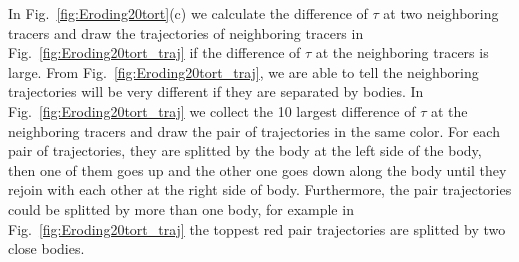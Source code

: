 \documentclass[preprint, 10pt]{elsarticle}
\begin{document}
{\color{red}
In Fig.~\ref{fig:Eroding20tort}(c) we calculate the difference of 
$\tau$ at two neighboring tracers 
and draw the trajectories of neighboring tracers in 
Fig.~\ref{fig:Eroding20tort_traj}
if the difference of $\tau$ at the neighboring tracers is large. 
From Fig.~\ref{fig:Eroding20tort_traj},
 we are able to tell the neighboring trajectories will be very 
different if they are separated by bodies. In Fig.~\ref{fig:Eroding20tort_traj}
we collect the 10 largest difference of $\tau$ at the neighboring tracers and 
draw the pair of trajectories in the same color. For each pair of trajectories, 
they are splitted by the body at the left side of the body, then
one of them goes up and the other one goes down along the body 
until they rejoin with each other at the right side of body.  
Furthermore, the pair trajectories could be splitted by more than one body, 
for example in Fig.~\ref{fig:Eroding20tort_traj} the toppest red pair trajectories 
are splitted by two close bodies.
}
\end{document}
